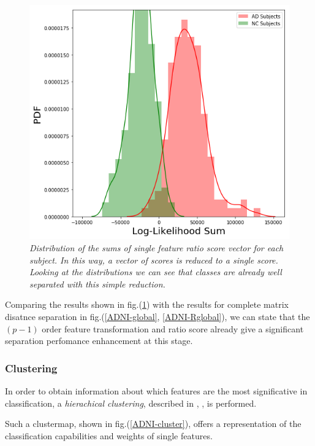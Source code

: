 \documentclass[12pt,openright,twoside,a4paper]{book}
\begin{document}
\begin{figure}[!h]
\centering
\includegraphics[scale=0.5]{diff-logpdf-dist}
\caption{\textit{Distribution of the sums of single feature ratio score vector for each subject. In this way, a vector of scores is reduced to a single score. Looking at the distributions we can see that classes are already well separated with this simple reduction.}}
\label{ADNI-sfsum}
\end{figure}

Comparing the results shown in fig.(\ref{ADNI-sfsum}) with the results for complete matrix disatnce separation in fig.(\ref{ADNI-global}, \ref{ADNI-Rglobal}), we can state that the $(p-1)$ order feature transformation and ratio score already give a significant separation perfomance enhancement at this stage.

\subsubsection*{Clustering}

In order to obtain information about which features are the most significative in classification, a \textit{hierachical clustering}, described in \cite{cluster}, \cite{cluster2},  is performed.
\vspace{5mm}

Such a clustermap, shown in fig.(\ref{ADNI-cluster}), offers a representation of the classification capabilities and weights of single features.
\end{document}
